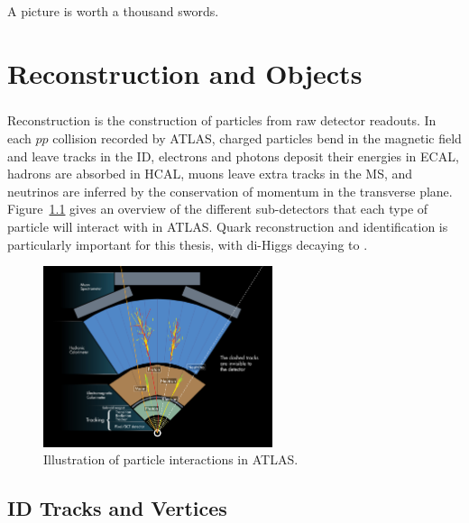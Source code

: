 \begin{savequote}[75mm]
A picture is worth a thousand swords.
\end{savequote}

\chapter{Reconstruction and Objects}

\paragraph{}
Reconstruction is the construction of particles from raw detector readouts. 
In each $pp$ collision recorded by ATLAS, charged particles bend in the magnetic field and leave tracks in the ID, electrons and photons deposit their energies in ECAL, hadrons are absorbed in HCAL, muons leave extra tracks in the MS, and neutrinos are inferred by the conservation of momentum in the transverse plane. 
Figure~\ref{fig:obj_reco_overview} gives an overview of the different sub-detectors that each type of particle will interact with in ATLAS. Quark reconstruction and identification is particularly important for this thesis, with di-Higgs decaying to \bbbb.

\begin{figure}[htbp!]
  \centering
  \captionsetup{justification=centering}
  \includegraphics[width=0.6\textwidth]{figures/detector/ATLAS_particle}
   \caption{Illustration of particle interactions in ATLAS.}
  \label{fig:obj_reco_overview}
\end{figure}

\section{ID Tracks and Vertices}

